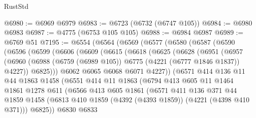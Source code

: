 \begin{lexlean}{RustStd}
\begin{coremodule}
{\begin{coremodule}
{{{{{{{{{{{{{{{{{{{{{{{{{{{{{{{@6980 := @6969 @6979
@6983 := @6723 (@6732 (@6747 @105))
@6984 := @6980 @6983
@6987 := @4775 (@6753 @105 @105)
@6988 := @6984 @6987
@6989 := @6769 @51
@7195 := @6554
    (@6564
      (@6569
        (@6577
          (@6580
            (@6587
              (@6590
                (@6596
                  (@6599
                    (@6606
                      (@6609
                        (@6615
                          (@6618
                            (@6625
                              (@6628
                                (@6951
                                  (@6957
                                    (@6960
                                      (@6988
                                        (@6759 (@6989 @105))
                                        @6775
                                        (@4221 (@6777 @1846 @1837))
                                        @4227))
                                    @6825)))
                              @6062
                              @6065
                              @6068
                              @6071
                              @4227))
                          (@6571
                            @414
                            @136
                            @11
                            @44
                            @1863
                            @1458
                            (@6551
                              @414
                              @11
                              @1863
                              (@6794
                                @413
                                @605
                                @11
                                @1464
                                @1861
                                @1278
                                @611
                                (@6566
                                  @413
                                  @605
                                  @1861
                                  (@6571
                                    @411
                                    @136
                                    @371
                                    @44
                                    @1859
                                    @1458
                                    (@6813
                                      @410
                                      @1859
                                      (@4392 (@4393 @1859))
                                      (@4221 (@4398 @410 @371)))
                                    @6825))
                                @6830
                                @6833
}}}}}}}}}}}}}}}}}}}}}}}}}}}}}}}
\end{coremodule}}
\end{coremodule}
\end{lexlean}
